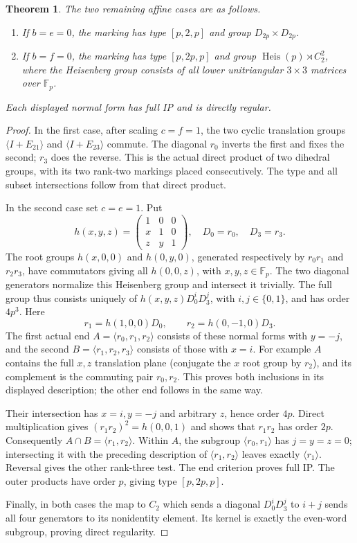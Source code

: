 \documentclass[11pt]{article}
\newtheorem{theorem}{Theorem}\newtheorem{lemma}[theorem]{Lemma}
\newcommand{\F}{\mathbb F}\newcommand{\PSL}{\operatorname{PSL}}
\begin{document}
\begin{theorem}\label{affine}
The two remaining affine cases are as follows.
\begin{enumerate}
\item If $b=e=0$, the marking has type $[p,2,p]$ and group
$D_{2p}\times D_{2p}$.
\item If $b=f=0$, the marking has type $[p,2p,p]$ and group
$\operatorname{Heis}(p)\rtimes C_2^2$, where the Heisenberg group
consists of all lower unitriangular $3\times3$ matrices over $\F_p$.
\end{enumerate}
Each displayed normal form has full IP and is directly regular.
\end{theorem}
\begin{proof}
In the first case, after scaling $c=f=1$, the two cyclic translation
groups $\langle I+E_{21}\rangle$ and $\langle I+E_{23}\rangle$
commute. The diagonal $r_0$ inverts the first and fixes the second;
$r_3$ does the reverse. This is the actual direct product of two
dihedral groups, with its two rank-two markings placed consecutively.
The type and all subset intersections follow from that direct product.

In the second case set $c=e=1$. Put
\[
 h(x,y,z)=\begin{pmatrix}1&0&0\\x&1&0\\z&y&1\end{pmatrix},
 \quad D_0=r_0,\quad D_3=r_3.
\]
The root groups $h(x,0,0)$ and $h(0,y,0)$, generated respectively
by $r_0r_1$ and $r_2r_3$, have commutators giving all $h(0,0,z)$,
with $x,y,z\in\F_p$. The two diagonal generators normalize this
Heisenberg group and intersect it trivially. The full group thus consists
uniquely of $h(x,y,z)D_0^iD_3^j$, with $i,j\in\{0,1\}$, and has
order $4p^3$. Here
\[
 r_1=h(1,0,0)D_0,\qquad r_2=h(0,-1,0)D_3.
\]
The first actual end $A=\langle r_0,r_1,r_2\rangle$ consists of
these normal forms with $y=-j$, and the second
$B=\langle r_1,r_2,r_3\rangle$ consists of those with $x=i$.
For example $A$ contains the full $x,z$ translation plane (conjugate
the $x$ root group by $r_2$), and its complement is the commuting
pair $r_0,r_2$. This proves both inclusions in its displayed description;
the other end follows in the same way.

Their intersection has $x=i,y=-j$ and arbitrary $z$, hence order $4p$.
Direct multiplication gives
$(r_1r_2)^2=h(0,0,1)$ and shows that $r_1r_2$ has order $2p$.
Consequently $A\cap B=\langle r_1,r_2\rangle$. Within $A$,
the subgroup $\langle r_0,r_1\rangle$ has $j=y=z=0$;
intersecting it with the preceding description of
$\langle r_1,r_2\rangle$ leaves exactly $\langle r_1\rangle$.
Reversal gives the other rank-three test. The end criterion proves
full IP. The outer products have order $p$, giving type $[p,2p,p]$.

Finally, in both cases the map to $C_2$ which sends a diagonal
$D_0^iD_3^j$ to $i+j$ sends all four generators to its nonidentity
element. Its kernel is exactly the even-word subgroup, proving direct
regularity.
\end{proof}
\end{document}
